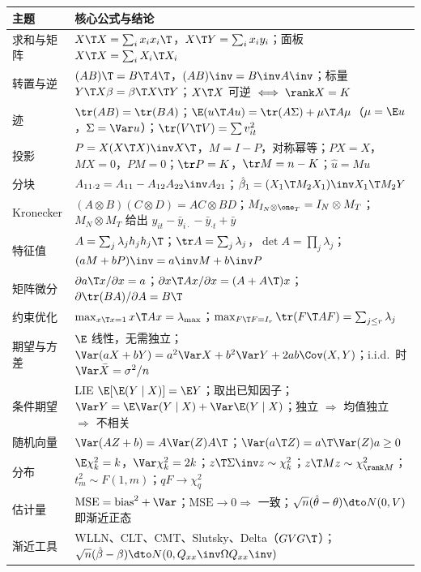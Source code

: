 \begin{center}\begin{minipage}{\linewidth}\centering
\small
\begin{tabularx}{\linewidth}{lL}
\toprule
主题 & 核心公式与结论\\
\midrule
求和与矩阵 & $X\T X=\sum_ix_ix_i\T$，$X\T Y=\sum_ix_iy_i$；面板 $X\T X=\sum_iX_i\T X_i$\\
转置与逆 & $(AB)\T=B\T A\T$，$(AB)\inv=B\inv A\inv$；标量 $Y\T X\beta=\beta\T X\T Y$；$X\T X$ 可逆 $\iff\rank X=K$\\
迹 & $\tr(AB)=\tr(BA)$；$\E(u\T Au)=\tr(A\Sigma)+\mu\T A\mu$（$\mu=\E u$，$\Sigma=\Var u$）；$\tr(V\T V)=\sum v_{it}^2$\\
投影 & $P=X(X\T X)\inv X\T$，$M=I-P$，对称幂等；$PX=X$，$MX=0$，$PM=0$；$\tr P=K$，$\tr M=n-K$；$\hat u=Mu$\\
分块 & $A_{11\cdot2}=A_{11}-A_{12}A_{22}\inv A_{21}$；$\hat\beta_1=(X_1\T M_2X_1)\inv X_1\T M_2Y$\\
Kronecker & $(A\otimes B)(C\otimes D)=AC\otimes BD$；$M_{I_N\otimes\one_T}=I_N\otimes M_T$；$M_N\otimes M_T$ 给出 $y_{it}-\bar y_{i\cdot}-\bar y_{\cdot t}+\bar y$\\
特征值 & $A=\sum_j\lambda_jh_jh_j\T$；$\tr A=\sum_j\lambda_j$，$\det A=\prod_j\lambda_j$；$(aM+bP)\inv=a\inv M+b\inv P$\\
矩阵微分 & $\partial a\T x/\partial x=a$；$\partial x\T Ax/\partial x=(A+A\T)x$；$\partial\tr(BA)/\partial A=B\T$\\
约束优化 & $\max_{x\T x=1}x\T Ax=\lambda_{\max}$；$\max_{F\T F=I_r}\tr(F\T AF)=\sum_{j\le r}\lambda_j$\\
期望与方差 & $\E$ 线性，无需独立；$\Var(aX+bY)=a^2\Var X+b^2\Var Y+2ab\Cov(X,Y)$；i.i.d.\ 时 $\Var\bar X=\sigma^2/n$\\
条件期望 & LIE $\E[\E(Y\mid X)]=\E Y$；取出已知因子；$\Var Y=\E\Var(Y\mid X)+\Var\E(Y\mid X)$；独立 $\Rightarrow$ 均值独立 $\Rightarrow$ 不相关\\
随机向量 & $\Var(AZ+b)=A\Var(Z)A\T$；$\Var(a\T Z)=a\T\Var(Z)a\ge0$\\
分布 & $\E\chi^2_k=k$，$\Var\chi^2_k=2k$；$z\T\Sigma\inv z\sim\chi^2_k$；$z\T Mz\sim\chi^2_{\rank M}$；$t_m^2\sim F(1,m)$；$qF\to\chi^2_q$\\
估计量 & $\text{MSE}=\text{bias}^2+\Var$；$\text{MSE}\to0\Rightarrow$ 一致；$\sqrt n(\hat\theta-\theta)\dto N(0,V)$ 即渐近正态\\
渐近工具 & WLLN、CLT、CMT、Slutsky、Delta（$GVG\T$）；$\sqrt n(\hat\beta-\beta)\dto N(0,Q_{xx}\inv\Omega Q_{xx}\inv)$\\
\bottomrule
\end{tabularx}
\end{minipage}\end{center}

